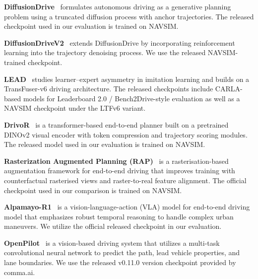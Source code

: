 \documentclass{article}
\begin{document}
\textbf{DiffusionDrive}~\cite{diffusiondrive} formulates autonomous driving as a generative planning problem using a truncated diffusion process with anchor trajectories. The released checkpoint used in our evaluation is trained on NAVSIM.

\textbf{DiffusionDriveV2}~\cite{diffusiondrivev2} extends DiffusionDrive by incorporating reinforcement learning into the trajectory denoising process. We use the released NAVSIM-trained checkpoint.

\textbf{LEAD}~\cite{LEAD} studies learner--expert asymmetry in imitation learning and builds on a TransFuser-v6 driving architecture. The released checkpoints include CARLA-based models for Leaderboard 2.0 / Bench2Drive-style evaluation as well as a NAVSIM checkpoint under the LTFv6 variant.

\textbf{DrivoR}~\cite{DrivoR} is a transformer-based end-to-end planner built on a pretrained DINOv2 visual encoder with token compression and trajectory scoring modules. The released model used in our evaluation is trained on NAVSIM.

\textbf{Rasterization Augmented Planning (RAP)}~\cite{RAP} is a rasterisation-based augmentation framework for end-to-end driving that improves training with counterfactual rasterised views and raster-to-real feature alignment. The official checkpoint used in our comparison is trained on NAVSIM.

\textbf{Alpamayo-R1}~\cite{wang2025alpamayo} is a vision-language-action (VLA) model for end-to-end driving model that emphasizes robust temporal reasoning to handle complex urban maneuvers. We utilize the official released checkpoint in our evaluation.

\textbf{OpenPilot}~\cite{openpilot2026} is a vision-based driving system that utilizes a multi-task convolutional neural network to predict the path, lead vehicle properties, and lane boundaries. We use the released v0.11.0 version checkpoint provided by comma.ai.
\end{document}
